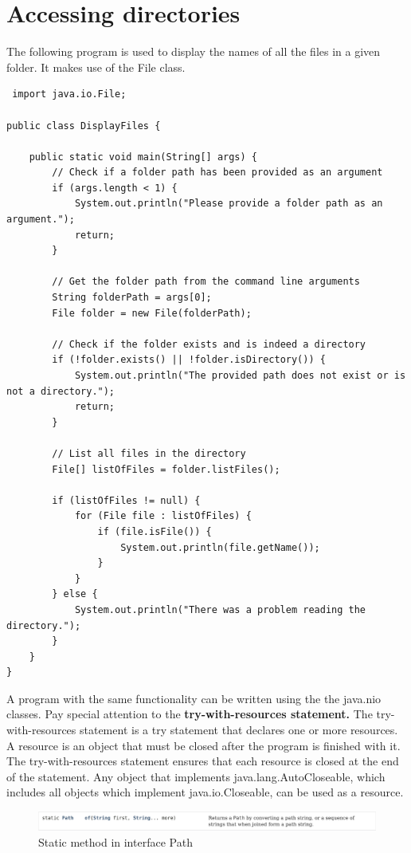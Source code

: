  
 \section{Accessing directories}
 
 The following program is used to display the names of all the files in a given folder.  It makes use of the File class.
 
 \begin{lstlisting}
 import java.io.File;

public class DisplayFiles {

    public static void main(String[] args) {
        // Check if a folder path has been provided as an argument
        if (args.length < 1) {
            System.out.println("Please provide a folder path as an argument.");
            return;
        }

        // Get the folder path from the command line arguments
        String folderPath = args[0];
        File folder = new File(folderPath);

        // Check if the folder exists and is indeed a directory
        if (!folder.exists() || !folder.isDirectory()) {
            System.out.println("The provided path does not exist or is not a directory.");
            return;
        }

        // List all files in the directory
        File[] listOfFiles = folder.listFiles();

        if (listOfFiles != null) {
            for (File file : listOfFiles) {
                if (file.isFile()) {
                    System.out.println(file.getName());
                }
            }
        } else {
            System.out.println("There was a problem reading the directory.");
        }
    }
}
\end{lstlisting}

A program with the same functionality can be written using the the java.nio classes. Pay special attention to the \textbf{try-with-resources statement.} The try-with-resources statement is a try statement that declares one or more resources. A resource is an object that must be closed after the program is finished with it. The try-with-resources statement ensures that each resource is closed at the end of the statement. Any object that implements java.lang.AutoCloseable, which includes all objects which implement java.io.Closeable, can be used as a resource.


\begin{figure}[H]
  \includegraphics[width=\linewidth]{images/file_io/path_of.png}
  \caption{Static method in interface Path}
  \label{fig:paths}
\end{figure}

